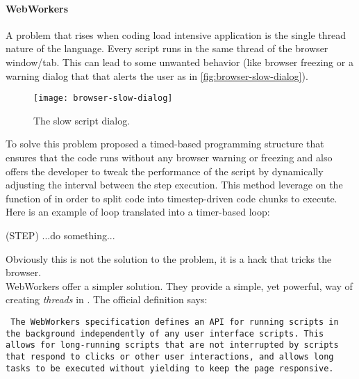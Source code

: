 \paragraph{WebWorkers}\label{html5:workers}
A problem that rises when coding load intensive \js{} application is the single thread nature
of the language. Every script runs in the same thread of the browser window/tab.
This can lead to some unwanted behavior (like browser freezing or a warning
dialog that that alerts the user as in \autoref{fig:browser-slow-dialog}).
\begin{figure}[htb]
    \centering
    \texttt{[image: browser-slow-dialog]}
    \caption{The slow script dialog.}
    \label{fig:browser-slow-dialog}
\end{figure}
To solve this problem \cite{jenkin2008parasitic} proposed a timed-based
programming structure that ensures that the code runs without any browser warning
or freezing and also offers the developer to tweak the performance of the script
by dynamically adjusting the interval between the step execution. This method
leverage on the  function of \js{} in order to split code into
timestep-driven code chunks to execute. Here is an example of loop translated
into a timer-based loop:
\begin{multicols}{2}
	\begin{algorithm}[H]
	\end{algorithm}

	\vfill
	\columnbreak

	\begin{algorithm}[H]

		\procedure(STEP){
			...do something...\\
		}
	\end{algorithm}
\end{multicols}
Obviously this is not the solution to the problem, it is a hack that tricks the
browser.\\


WebWorkers offer a simpler solution. They provide a simple, yet powerful, way of
creating \emph{threads} in \js{}. The official definition says:
\begin{quoting}\rm\tt
	The WebWorkers specification defines an API for running scripts in the
	background independently of any user interface scripts.	This allows for
	long-running scripts that are not interrupted by scripts that respond to
	clicks or other user interactions, and allows long tasks to be executed
	without yielding to keep the page responsive.
\end{quoting}

